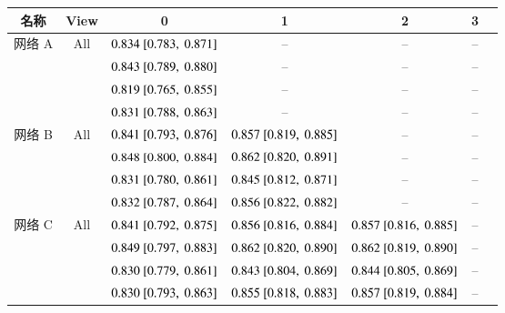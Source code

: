 \renewcommand{\captiontitle}{网络性能评估}
\begin{sidewaystable*}
\begin{center}
\begin{tabular}{ccccccc} \hline
\toprule
名称      & View   & \UNet{} 0                 & \UNet{} 1                 & \UNet{} 2                 & \UNet{} 3                 \\
\midrule
网络 A & All    & $0.834~[0.783,~0.871]$ & --                        & --                        & --                        \\
          & \SA{}  & $0.843~[0.789,~0.880]$ & --                        & --                        & --                        \\
          & \HLA{} & $0.819~[0.765,~0.855]$ & --                        & --                        & --                        \\
          & \VLA{} & $0.831~[0.788,~0.863]$ & --                        & --                        & --                        \\
\midrule
网络 B & All    & $0.841~[0.793,~0.876]$ & $0.857~[0.819,~0.885]$ & --                        & --                        \\
          & \SA{}  & $0.848~[0.800,~0.884]$ & $0.862~[0.820,~0.891]$ & --                        & --                        \\
          & \HLA{} & $0.831~[0.780,~0.861]$ & $0.845~[0.812,~0.871]$ & --                        & --                        \\
          & \VLA{} & $0.832~[0.787,~0.864]$ & $0.856~[0.822,~0.882]$ & --                        & --                        \\
\midrule
网络 C & All    & $0.841~[0.792,~0.875]$ & $0.856~[0.816,~0.884]$ & $0.857~[0.816,~0.885]$ & --                        \\
          & \SA{}  & $0.849~[0.797,~0.883]$ & $0.862~[0.820,~0.890]$ & $0.862~[0.819,~0.890]$ & --                        \\
          & \HLA{} & $0.830~[0.779,~0.861]$ & $0.843~[0.804,~0.869]$ & $0.844~[0.805,~0.869]$ & --                        \\
          & \VLA{} & $0.830~[0.793,~0.863]$ & $0.855~[0.818,~0.883]$ & $0.857~[0.819,~0.884]$ & --                        \\

\end{tabular}
\end{center}
\end{sidewaystable*}
